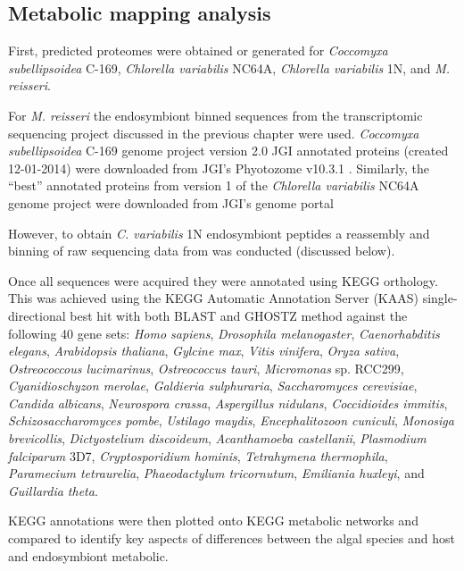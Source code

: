 \subsection{Metabolic mapping analysis}

First, predicted proteomes were obtained or generated for
\textit{Coccomyxa subellipsoidea} C-169, \textit{Chlorella variabilis}
NC64A, \textit{Chlorella variabilis} 1N, and \textit{M. reisseri}. 

For \textit{M. reisseri} the endosymbiont binned sequences from the transcriptomic
sequencing project discussed in the previous chapter were used. 
\textit{Coccomyxa subellipsoidea} C-169 genome project \citep{Blanc2012} version 2.0 
JGI annotated proteins (created 12-01-2014) were downloaded from JGI's
Phyotozome v10.3.1 \citep{Goodstein2012}. 
Similarly, the ``best'' annotated proteins from
version 1 of the \textit{Chlorella variabilis} NC64A genome project \citep{Blanc2010}
were downloaded from JGI's genome portal \citep{Grigoriev2011,Nordberg2014}

However, to obtain \textit{C. variabilis} 1N endosymbiont peptides 
a reassembly and binning of raw sequencing data from \citep{Kodama2014}
was conducted (discussed below). 

Once all sequences were acquired they were annotated using KEGG
orthology.  This was achieved 
using the KEGG Automatic Annotation Server (KAAS) \citep{Moriya2007a}
single-directional best hit with both BLAST and GHOSTZ \citep{Suzuki2014,Suzuki2015} 
method against the following 40 gene sets: \textit{Homo sapiens}, 
\textit{Drosophila melanogaster}, \textit{Caenorhabditis elegans},
\textit{Arabidopsis thaliana}, \textit{Gylcine max},
\textit{Vitis vinifera}, \textit{Oryza sativa}, 
\textit{Ostreococcous lucimarinus}, \textit{Ostreococcus tauri},
\textit{Micromonas} sp. RCC299, \textit{Cyanidioschyzon merolae},
\textit{Galdieria sulphuraria}, \textit{Saccharomyces cerevisiae},
\textit{Candida albicans}, \textit{Neurospora crassa}, \textit{Aspergillus nidulans},
\textit{Coccidioides immitis}, \textit{Schizosaccharomyces pombe},
\textit{Ustilago maydis}, \textit{Encephalitozoon cuniculi},
\textit{Monosiga brevicollis}, \textit{Dictyostelium discoideum}, 
\textit{Acanthamoeba castellanii}, \textit{Plasmodium falciparum} 3D7, 
\textit{Cryptosporidium hominis}, \textit{Tetrahymena thermophila},
\textit{Paramecium tetraurelia}, \textit{Phaeodactylum tricornutum},
\textit{Emiliania huxleyi}, and \textit{Guillardia theta}.

KEGG annotations were then plotted onto KEGG metabolic networks and compared 
to identify key aspects of differences between the algal species and
host and endosymbiont metabolic.

